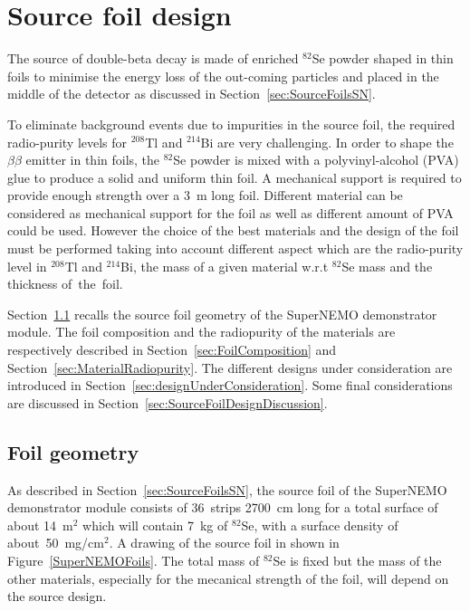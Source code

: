 \documentclass[main.tex]{subfiles}
\begin{document}
\bigskip


\section{Source foil design}\label{sec:SourceFoilDesign}


\NI The source of double-beta decay is made of enriched $^{\text{82}}$Se powder shaped in thin foils to minimise the energy loss of the out-coming particles and placed in the middle of the detector as discussed in Section~\ref{sec:SourceFoilsSN}.


\bigskip


\NI To eliminate background events due to impurities in the source foil, the required radio-purity levels for $^{\text{208}}$Tl and $^{\text{214}}$Bi are very challenging. In order to shape the $\beta\beta$ emitter in thin foils, the $^{\text{82}}$Se powder is mixed with a polyvinyl-alcohol (PVA) glue to produce a solid and uniform thin foil. A mechanical support is required to provide enough strength over a 3~m long foil. Different material can be considered as mechanical support for the foil as well as different amount of PVA could be used. However the choice of the best materials and the design of the foil must be performed taking into account different aspect which are the radio-purity level in $^{\text{208}}$Tl and $^{\text{214}}$Bi, the mass of a given material w.r.t $^{\text{82}}$Se mass and the thickness of~the~foil.


\bigskip


\NI Section~\ref{sec:FoilGeometry} recalls the source foil geometry of the SuperNEMO demonstrator module. The foil composition and the radiopurity of the materials are respectively described in Section~\ref{sec:FoilComposition} and Section~\ref{sec:MaterialRadiopurity}. The different designs under consideration are introduced in Section~\ref{sec:designUnderConsideration}. Some final considerations are discussed in Section~\ref{sec:SourceFoilDesignDiscussion}.


\subsection{Foil geometry}\label{sec:FoilGeometry}


\NI As described in Section~\ref{sec:SourceFoilsSN}, the source foil of the SuperNEMO demonstrator module consists of 36~strips 2700~cm long for a total surface of about 14~m$^\text{2}$ which will contain 7~kg of $^{\text{82}}$Se, with a surface density of about~50~mg/cm$^\text{2}$. A drawing of the source foil in shown in Figure~\ref{SuperNEMOFoils}. The total mass of $^{\text{82}}$Se is fixed but the mass of the other materials, especially for the mecanical strength of the foil, will depend on the source design.
\end{document}

